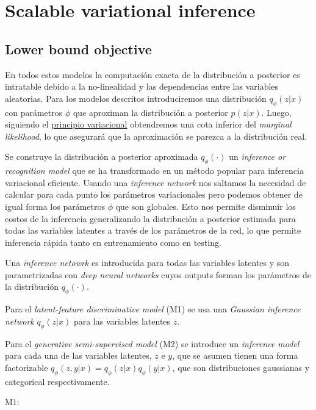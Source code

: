 \documentclass[letterpaper,11pt]{article} %
\begin{document}
\section{Scalable variational inference}

\subsection{Lower bound objective}

	En todos estos modelos la computación exacta de la distribución a posterior es intratable debido a la no-linealidad y las dependencias entre las variables aleatorias.  
	Para los modelos descritos introduciremos una distribución $q_{\phi}(z|x)$ con parámetros $\phi$ que aproximan la distribución a posterior $p(z|x)$. Luego, siguiendo el \href{https://en.wikipedia.org/wiki/Variational_principle}{principio variacional} obtendremos una cota inferior del \textit{marginal likelihood}, lo que asegurará que la aproximación se parezca a la distribución real.  
	
	Se construye la distribución a posterior aproximada $q_{\phi}(\cdot)$ un \textit{inference or recognition model} que se ha transformado en un método popular para inferencia variacional eficiente.  
	Usando una \textit{inference network} nos saltamos la necesidad de calcular para cada punto los parámetros variacionales pero podemos obtener de igual forma los parámetros $\phi$ que son globales. Esto nos permite disminuir los costos de la inferencia generalizando la distribución a posterior estimada para todas las variables latentes a través de los parámetros de la red, lo que permite inferencia rápida tanto en entrenamiento como en testing.  
	
	Una \textit{inference netowrk} es introducida para todas las variables latentes y son parametrizadas con \textit{deep neural networks} cuyos outputs forman los parámetros de la distribución $q_{\phi}(\cdot)$.
	
	Para el \textit{latent-feature discriminative model} (M1) se usa una \textit{Gaussian inference network} $q_{\phi}(z|x)$ para las variables latentes $z$.
	
	Para el \textit{generative semi-supervised model} (M2) se introduce un \textit{inference model} para cada una de las variables latentes, $z$ e $y$, que se asumen tienen una forma factorizable $q_{\phi}(z,y|x) = q_{\phi}(z|x)q_{\phi}(y|x)$, que son distribuciones gaussianas y categorical  respectivamente.
	
	M1:
	
\end{document}
